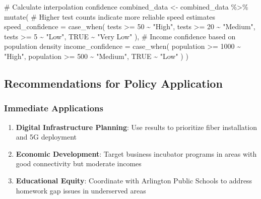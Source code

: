 \documentclass[
  letterpaper,
  DIV=11,
  numbers=noendperiod]{scrartcl}
\newenvironment{Shaded}{\begin{snugshade}}{\end{snugshade}}
\newcommand{\AttributeTok}[1]{\textcolor[rgb]{0.40,0.45,0.13}{#1}}
\newcommand{\CommentTok}[1]{\textcolor[rgb]{0.37,0.37,0.37}{#1}}
\newcommand{\ConstantTok}[1]{\textcolor[rgb]{0.56,0.35,0.01}{#1}}
\newcommand{\DecValTok}[1]{\textcolor[rgb]{0.68,0.00,0.00}{#1}}
\newcommand{\FunctionTok}[1]{\textcolor[rgb]{0.28,0.35,0.67}{#1}}
\newcommand{\NormalTok}[1]{\textcolor[rgb]{0.00,0.23,0.31}{#1}}
\newcommand{\OtherTok}[1]{\textcolor[rgb]{0.00,0.23,0.31}{#1}}
\newcommand{\SpecialCharTok}[1]{\textcolor[rgb]{0.37,0.37,0.37}{#1}}
\newcommand{\StringTok}[1]{\textcolor[rgb]{0.13,0.47,0.30}{#1}}
\providecommand{\tightlist}{%
  \setlength{\itemsep}{0pt}\setlength{\parskip}{0pt}}
\begin{document}
\begin{Shaded}
\begin{Highlighting}[]
\CommentTok{\# Calculate interpolation confidence}
\NormalTok{combined\_data }\OtherTok{\textless{}{-}}\NormalTok{ combined\_data }\SpecialCharTok{\%\textgreater{}\%}
  \FunctionTok{mutate}\NormalTok{(}
    \CommentTok{\# Higher test counts indicate more reliable speed estimates}
    \AttributeTok{speed\_confidence =} \FunctionTok{case\_when}\NormalTok{(}
\NormalTok{      tests }\SpecialCharTok{\textgreater{}=} \DecValTok{50} \SpecialCharTok{\textasciitilde{}} \StringTok{"High"}\NormalTok{,}
\NormalTok{      tests }\SpecialCharTok{\textgreater{}=} \DecValTok{20} \SpecialCharTok{\textasciitilde{}} \StringTok{"Medium"}\NormalTok{, }
\NormalTok{      tests }\SpecialCharTok{\textgreater{}=} \DecValTok{5} \SpecialCharTok{\textasciitilde{}} \StringTok{"Low"}\NormalTok{,}
      \ConstantTok{TRUE} \SpecialCharTok{\textasciitilde{}} \StringTok{"Very Low"}
\NormalTok{    ),}
    \CommentTok{\# Income confidence based on population density}
    \AttributeTok{income\_confidence =} \FunctionTok{case\_when}\NormalTok{(}
\NormalTok{      population }\SpecialCharTok{\textgreater{}=} \DecValTok{1000} \SpecialCharTok{\textasciitilde{}} \StringTok{"High"}\NormalTok{,}
\NormalTok{      population }\SpecialCharTok{\textgreater{}=} \DecValTok{500} \SpecialCharTok{\textasciitilde{}} \StringTok{"Medium"}\NormalTok{,}
      \ConstantTok{TRUE} \SpecialCharTok{\textasciitilde{}} \StringTok{"Low"}
\NormalTok{    )}
\NormalTok{  )}
\end{Highlighting}
\end{Shaded}

\subsection{Recommendations for Policy
Application}\label{recommendations-for-policy-application}

\subsubsection{Immediate Applications}\label{immediate-applications}

\begin{enumerate}
\def\labelenumi{\arabic{enumi}.}
\tightlist
\item
  \textbf{Digital Infrastructure Planning}: Use results to prioritize
  fiber installation and 5G deployment
\item
  \textbf{Economic Development}: Target business incubator programs in
  areas with good connectivity but moderate incomes
\item
  \textbf{Educational Equity}: Coordinate with Arlington Public Schools
  to address homework gap issues in underserved areas
\end{enumerate}
\end{document}
